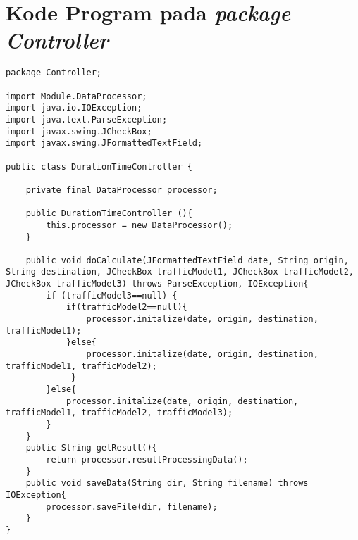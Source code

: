 \chapter{Kode Program pada \textit{package Controller}}
\label{chap:kodeprogramB}

\begin{lstlisting}[caption= DurationTimeController.java]
package Controller;

import Module.DataProcessor;
import java.io.IOException;
import java.text.ParseException;
import javax.swing.JCheckBox;
import javax.swing.JFormattedTextField;

public class DurationTimeController {
    
    private final DataProcessor processor;
    
    public DurationTimeController (){
        this.processor = new DataProcessor();
    }
    
    public void doCalculate(JFormattedTextField date, String origin, String destination, JCheckBox trafficModel1, JCheckBox trafficModel2, JCheckBox trafficModel3) throws ParseException, IOException{
        if (trafficModel3==null) {
            if(trafficModel2==null){
                processor.initalize(date, origin, destination, trafficModel1);
            }else{
                processor.initalize(date, origin, destination, trafficModel1, trafficModel2);
             }
        }else{
            processor.initalize(date, origin, destination, trafficModel1, trafficModel2, trafficModel3);
        }
    }
    public String getResult(){
        return processor.resultProcessingData();
    }
    public void saveData(String dir, String filename) throws IOException{
        processor.saveFile(dir, filename);
    }        
}
\end{lstlisting}